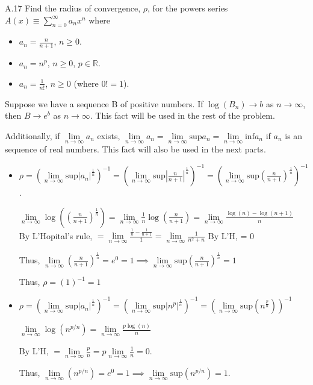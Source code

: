 \documentclass[12pt,letterpaper, onecolumn]{exam}
\newcommand{\real}{\mathbb{R}}
\newcommand{\cutelim}{\lim\limits_{n\to\infty}}
\begin{document}
\begin{questions}
    \question A.17 Find the radius of convergence, $\rho$, for the powers series $A(x) \equiv \sum^\infty_{n=0} a_n x^n$ where 
    \begin{itemize}
    \item[(a)] $a_n= \frac{n}{n+1}$, $n\geq0$.
    \item[(b)] $a_n =n^p$, $n\geq0$, $p\in \real$.
    \item[(c)] $a_n = \frac{1}{n!}$, $n \geq 0$ (where $0! = 1$).
    \end{itemize}
    \begin{solution}
    Suppose we have a sequence B of positive numbers. If $\log(B_n) \to b$ as $n \to \infty$, then $B \to e^b$ as $n \to \infty$. This fact will be used in the rest of the problem. 

    Additionally, if $\lim\limits_{n\to\infty}a_n$ exists, $\lim\limits_{n\to\infty}a_n =\lim\limits_{n\to\infty}\textrm{sup}a_n  = \lim\limits_{n\to\infty}\textrm{inf}a_n$ if $a_n$ is an sequence of real numbers. This fact will also be used in the next parts. 
    \begin{itemize}
        \item[(a)]
        $\rho = (\lim\limits_{n\to\infty}\textrm{sup}|a_n|^{\tfrac{1}{n}})^{-1} = (\lim\limits_{n\to\infty}\textrm{sup}|\frac{n}{n+1}|^{\tfrac{1}{n}})^{-1} = (\lim\limits_{n\to\infty}\textrm{sup}(\frac{n}{n+1})^{\tfrac{1}{n}})^{-1}$. 

        $\cutelim\log((\frac{n}{n+1})^{\tfrac{1}{n}}) = \cutelim\frac{1}{n}\log(\frac{n}{n+1}) = \cutelim \frac{\log(n) - \log(n+1)}{n}$ \\
        By L'Hopital's rule, $= \cutelim \frac{\tfrac{1}{n} - \frac{1}{n+1}}{1} = \cutelim \frac{1}{n^2 + n}$
        By L'H, = 0

        Thus, $\cutelim(\frac{n}{n+1})^\frac{1}{n} = e^0 = 1 \implies \cutelim\textrm{sup}(\frac{n}{n+1})^\frac{1}{n} = 1$

        Thus, $\rho = (1)^{-1} = 1$
        \item[(b)]
        $\rho = (\lim\limits_{n\to\infty}\textrm{sup}|a_n|^{\tfrac{1}{n}})^{-1} = (\lim\limits_{n\to\infty}\textrm{sup}|n^p|^{\tfrac{1}{n}})^{-1} = (\lim\limits_{n\to\infty}\textrm{sup} (n^{\tfrac{p}{n}}))^{-1}$

        $\cutelim \log(n^{p/n}) = \cutelim\frac{p\log(n)}{n}$

        By L'H, $=\cutelim \frac{p}{n} = p \cutelim\frac{1}{n} = 0$.

        Thus, $\cutelim (n^{p/n}) = e^0=1 \implies \cutelim \textrm{sup}(n^{p/n}) = 1$.


\end{itemize}
\end{solution}
\end{questions}
\end{document}
